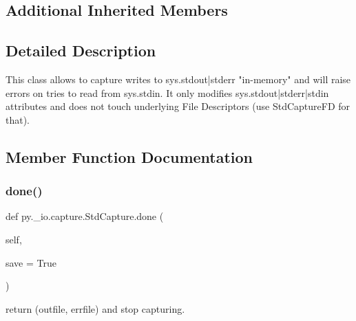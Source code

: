 \subsection*{Additional Inherited Members}


\subsection{Detailed Description}
\begin{DoxyVerb}This class allows to capture writes to sys.stdout|stderr "in-memory"
    and will raise errors on tries to read from sys.stdin. It only
    modifies sys.stdout|stderr|stdin attributes and does not
    touch underlying File Descriptors (use StdCaptureFD for that).
\end{DoxyVerb}
 

\subsection{Member Function Documentation}
\mbox{\label{classpy_1_1__io_1_1capture_1_1_std_capture_a9d142cac1dcf577a7c819e4ebcb30fb7}} 
\subsubsection{\texorpdfstring{done()}{done()}}
{\footnotesize\ttfamily def py.\+\_\+io.\+capture.\+Std\+Capture.\+done (\begin{DoxyParamCaption}\item[{}]{self,  }\item[{}]{save = {\ttfamily True} }\end{DoxyParamCaption})}

\begin{DoxyVerb}return (outfile, errfile) and stop capturing. \end{DoxyVerb}
 \mbox{\label{classpy_1_1__io_1_1capture_1_1_std_capture_ae843e689868aff7d502b9328b040bf9d}} 
